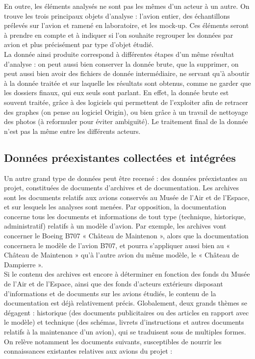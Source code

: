 En outre, les éléments analysés ne sont pas les mêmes d’un acteur à un autre. On trouve les trois principaux objets d’analyse : l’avion entier, des échantillons prélevés sur l’avion et ramené en laboratoire, et les mock-up. Ces éléments seront à prendre en compte et à indiquer si l'on souhaite regrouper les données par avion et plus précisément par type d'objet étudié.\\

La donnée ainsi produite correspond à différentes étapes d’un même résultat d’analyse : on peut aussi bien conserver la donnée brute, que la supprimer, on peut aussi bien avoir des fichiers de donnée intermédiaire, ne servant qu’à aboutir à la donnée traitée et sur laquelle les résultats sont obtenus, comme ne garder que les dossiers finaux, qui eux seuls sont parlant.  En effet, la donnée brute est souvent traitée, grâce à des logiciels qui permettent de l’exploiter afin de retracer des graphes (on pense au logiciel Origin), ou bien grâce à un travail de nettoyage des photos (à reformuler pour éviter ambiguïté). Le traitement final de la donnée n’est pas la même entre les différents acteurs.

        \subsection{Données préexistantes collectées et intégrées}

Un autre grand type de données peut être recensé : des données préexistantes au projet, constituées de documents d’archives et de documentation. Les archives sont les documents relatifs aux avions conservés au Musée de l’Air et de l’Espace, et sur lesquels les analyses sont menées. Par opposition, la documentation concerne tous les documents et informations de tout type (technique, historique, administratif) relatifs à un modèle d’avion. Par exemple, les archives vont concerner le Boeing B707 « Château de Maintenon », alors que la documentation concernera le modèle de l’avion B707, et pourra s’appliquer aussi bien au « Château de Maintenon » qu'à l'autre avion du même modèle, le « Château de Dampierre ».\\

Si le contenu des archives est encore à déterminer en fonction des fonds du Musée de l’Air et de l’Espace, ainsi que des fonds d’acteurs extérieurs disposant d’informations et de documents sur les avions étudiés, le contenu de la documentation est déjà relativement précis. Globalement, deux grands thèmes se dégagent : historique (des documents publicitaires ou des articles en rapport avec le modèle) et technique (des schémas, livrets d’instructions et autres documents relatifs à la maintenance d’un avion), qui se traduisent sous de multiples formes. On relève notamment les documents suivants, susceptibles de nourrir les connaissances existantes relatives aux avions du projet :\\


